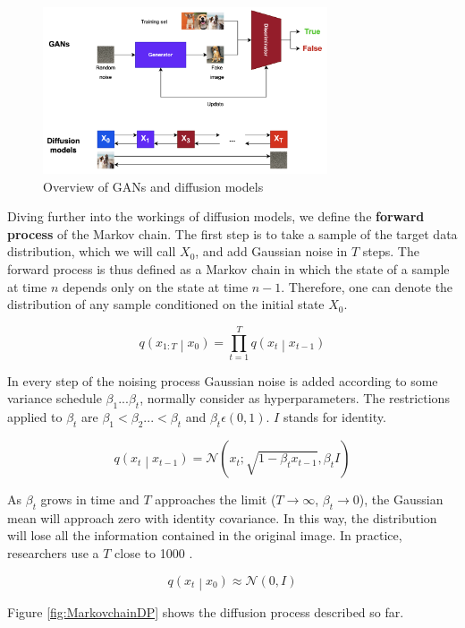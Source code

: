 \begin{figure}
    \centering
    \includegraphics[width=0.75\textwidth]{Pictures/GansvsDM} 
    \caption{Overview of GANs and diffusion models}
    \label{fig:GansvsDM}
\end{figure}

Diving further into the workings of diffusion models, we define the \textbf{forward process} of the Markov chain. The first step is to take a sample of the target data distribution, which we will call $X_0$, and add Gaussian noise in $T$ steps. The forward process is thus defined as a Markov chain in which the state of a sample at time $n$ depends only on the state at time $n-1$. Therefore, one can denote the distribution of any sample conditioned on the initial state $X_0$.

\[ q\left(x_{1:T}\middle| x_0\right)=\prod_{t=1}^{T}{q\left(x_t\middle| x_{t-1}\right)} \]

In every step of the noising process Gaussian noise is added according to some variance schedule $\beta_1...\beta_t$, normally consider as hyperparameters. The restrictions applied to $\beta_t$ are $\beta_1 < \beta_2 ... < \beta_t$ and $\beta_t \epsilon (0, 1)$. $I$ stands for identity.

\[q\left(x_t\middle| x_{t-1}\right)=\mathcal{N}\left(x_t;\sqrt{1-\beta_tx_{t-1}},\beta_tI\right) \]

As $\beta_t$ grows in time and $T$ approaches the limit ($T \rightarrow\infty$, $\beta_t \rightarrow 0$), the Gaussian mean will approach zero with identity covariance. In this way, the distribution will lose all the information contained in the original image. In practice, researchers use a $T$ close to 1000 \cite{ho2020denoising}.

\[q\left(x_t\middle| x_0\right)\approx\mathcal{N}\left(0,I\right)\]

Figure \ref{fig:MarkovchainDP} shows the diffusion process described so far.


